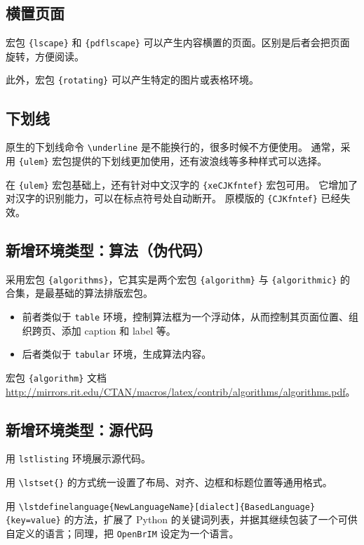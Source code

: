 \documentclass[../Main/thesis.tex]{subfiles}
\begin{document}
\subsection{横置页面}

宏包 \texttt{\{lscape\}} 和 \texttt{\{pdflscape\}}
可以产生内容横置的页面。区别是后者会把页面旋转，方便阅读。

此外，宏包 \texttt{\{rotating\}} 可以产生特定的图片或表格环境。

\subsection{下划线}

原生的下划线命令 \texttt{\textbackslash{}underline}
是不能换行的，很多时候不方便使用。 通常，采用 \texttt{\{ulem\}}
宏包提供的下划线更加使用，还有波浪线等多种样式可以选择。

在 \texttt{\{ulem\}} 宏包基础上，还有针对中文汉字的
\texttt{\{xeCJKfntef\}} 宏包可用。
它增加了对汉字的识别能力，可以在标点符号处自动断开。 原模版的
\texttt{\{CJKfntef\}} 已经失效。

\subsection{新增环境类型：算法（伪代码）}

采用宏包 \texttt{\{algorithms\}}，它其实是两个宏包
\texttt{\{algorithm\}} 与 \texttt{\{algorithmic\}}
的合集，是最基础的算法排版宏包。

\begin{itemize}
\item
  前者类似于 \texttt{table}
  环境，控制算法框为一个浮动体，从而控制其页面位置、组织跨页、添加
  caption 和 label 等。
\item
  后者类似于 \texttt{tabular} 环境，生成算法内容。
\end{itemize}

宏包 \texttt{\{algorithm\}} 文档
\url{http://mirrors.rit.edu/CTAN/macros/latex/contrib/algorithms/algorithms.pdf}。

\subsection{新增环境类型：源代码}

用 \texttt{lstlisting} 环境展示源代码。

用 \texttt{\textbackslash{}lstset\{\}}
的方式统一设置了布局、对齐、边框和标题位置等通用格式。

用
\texttt{\textbackslash{}lstdefinelanguage\{NewLanguageName\}{[}dialect{]}\{BasedLanguage\}\{key=value\}}
的方法，扩展了 Python
的关键词列表，并据其继续包装了一个可供自定义的语言；同理，把
\texttt{OpenBrIM} 设定为一个语言。
\end{document}
